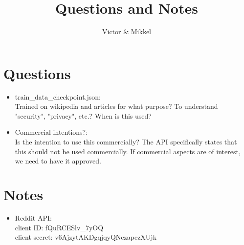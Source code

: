 \documentclass{article}
\begin{document}
\title{Questions and Notes}
\author{Victor \& Mikkel}

\maketitle

\section{Questions}
\begin{itemize}
	\item train\_data\_checkpoint.json:\\
	Trained on wikipedia and articles for what purpose?
	To understand "security", "privacy", etc.?
	When is this used?
	\item Commercial intentions?:\\
	Is the intention to use this commercially?
	The API specifically states that this should not be used commercially.
	If commercial aspects are of interest, we need to have it approved.


\end{itemize}

\section{Notes}
\begin{itemize}
	\item Reddit API:\\
	client ID: fQuRCESlv\_7yOQ\\
	client secret: v6AjzytAKDgqjqyQNczapezXUjk
\end{itemize}
\end{document}
